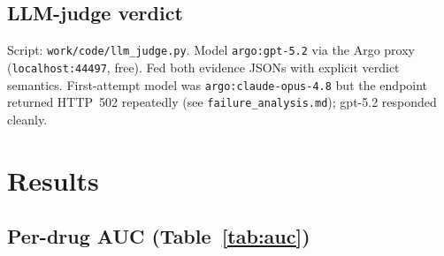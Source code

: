 \documentclass[11pt,letterpaper]{article}
\begin{document}
\subsection{LLM-judge verdict}
Script: \texttt{work/code/llm\_judge.py}. Model
\texttt{argo:gpt-5.2} via the Argo proxy (\texttt{localhost:44497},
free). Fed both evidence JSONs with explicit verdict semantics. First-attempt
model was \texttt{argo:claude-opus-4.8} but the endpoint returned HTTP~502
repeatedly (see \texttt{failure\_analysis.md}); gpt-5.2 responded cleanly.

\section{Results}

\subsection{Per-drug AUC (Table~\ref{tab:auc})}
\end{document}
